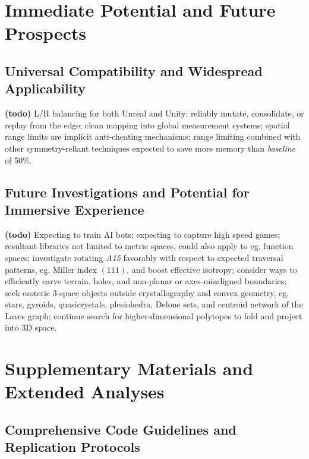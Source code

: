 \documentclass[10pt]{article}
\def\AAAB{\textit{A15}}
\begin{document}
\section{ Immediate Potential and Future Prospects }\label{immediate-potential-and-future-prospects}

\subsection{ Universal Compatibility and Widespread Applicability }\label{universal-compatibility-and-widespread-applicability}

\textbf{(todo)} L/R balancing for both Unreal and Unity; reliably mutate, consolidate, or replay from the edge; clean mapping
into global measurement systems; spatial range limits are implicit anti-cheating mechanisms; range limiting combined with other
symmetry-reliant techniques expected to save more memory than \emph{baseline} of 50\%.

\subsection{ Future Investigations and Potential for Immersive Experience
}\label{future-investigations-and-potential-for-immersive-experience}

\textbf{(todo)} Expecting to train AI bots; expecting to capture high speed games; resultant libraries not limited to metric
spaces, could also apply to eg. function spaces; investigate rotating \AAAB{} favorably with respect to expected traversal
patterns, eg. Miller index $(111)$, and boost effective isotropy; consider ways to efficiently carve terrain, holes, and
non-planar or axes-misaligned boundaries; seek esoteric 3-space objects outside crystallography and convex geometry, eg. stars,
gyroids, quasicrystals, plesiohedra, Delone sets, and centroid network of the Laves graph; continue search for higher-dimensional
polytopes to fold and project into 3D space.


\section{ Supplementary Materials and Extended Analyses }\label{supplementary-materials-and-extended-analyses}

\subsection{ Comprehensive Code Guidelines and Replication Protocols
}\label{comprehensive-code-guidelines-and-replication-protocols}
\end{document}
